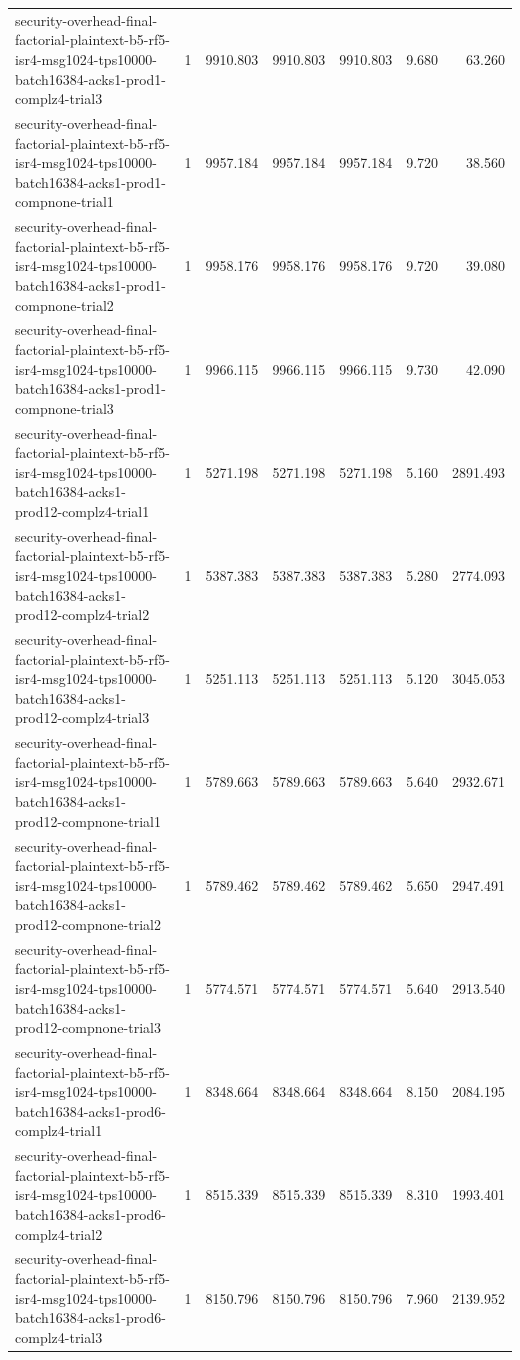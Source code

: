 \begin{tabular}{lrrrrrr}
security-overhead-final-factorial-plaintext-b5-rf5-isr4-msg1024-tps10000-batch16384-acks1-prod1-complz4-trial3 & 1 & 9910.803 & 9910.803 & 9910.803 & 9.680 & 63.260 \\
security-overhead-final-factorial-plaintext-b5-rf5-isr4-msg1024-tps10000-batch16384-acks1-prod1-compnone-trial1 & 1 & 9957.184 & 9957.184 & 9957.184 & 9.720 & 38.560 \\
security-overhead-final-factorial-plaintext-b5-rf5-isr4-msg1024-tps10000-batch16384-acks1-prod1-compnone-trial2 & 1 & 9958.176 & 9958.176 & 9958.176 & 9.720 & 39.080 \\
security-overhead-final-factorial-plaintext-b5-rf5-isr4-msg1024-tps10000-batch16384-acks1-prod1-compnone-trial3 & 1 & 9966.115 & 9966.115 & 9966.115 & 9.730 & 42.090 \\
security-overhead-final-factorial-plaintext-b5-rf5-isr4-msg1024-tps10000-batch16384-acks1-prod12-complz4-trial1 & 1 & 5271.198 & 5271.198 & 5271.198 & 5.160 & 2891.493 \\
security-overhead-final-factorial-plaintext-b5-rf5-isr4-msg1024-tps10000-batch16384-acks1-prod12-complz4-trial2 & 1 & 5387.383 & 5387.383 & 5387.383 & 5.280 & 2774.093 \\
security-overhead-final-factorial-plaintext-b5-rf5-isr4-msg1024-tps10000-batch16384-acks1-prod12-complz4-trial3 & 1 & 5251.113 & 5251.113 & 5251.113 & 5.120 & 3045.053 \\
security-overhead-final-factorial-plaintext-b5-rf5-isr4-msg1024-tps10000-batch16384-acks1-prod12-compnone-trial1 & 1 & 5789.663 & 5789.663 & 5789.663 & 5.640 & 2932.671 \\
security-overhead-final-factorial-plaintext-b5-rf5-isr4-msg1024-tps10000-batch16384-acks1-prod12-compnone-trial2 & 1 & 5789.462 & 5789.462 & 5789.462 & 5.650 & 2947.491 \\
security-overhead-final-factorial-plaintext-b5-rf5-isr4-msg1024-tps10000-batch16384-acks1-prod12-compnone-trial3 & 1 & 5774.571 & 5774.571 & 5774.571 & 5.640 & 2913.540 \\
security-overhead-final-factorial-plaintext-b5-rf5-isr4-msg1024-tps10000-batch16384-acks1-prod6-complz4-trial1 & 1 & 8348.664 & 8348.664 & 8348.664 & 8.150 & 2084.195 \\
security-overhead-final-factorial-plaintext-b5-rf5-isr4-msg1024-tps10000-batch16384-acks1-prod6-complz4-trial2 & 1 & 8515.339 & 8515.339 & 8515.339 & 8.310 & 1993.401 \\
security-overhead-final-factorial-plaintext-b5-rf5-isr4-msg1024-tps10000-batch16384-acks1-prod6-complz4-trial3 & 1 & 8150.796 & 8150.796 & 8150.796 & 7.960 & 2139.952 \\

\end{tabular}
